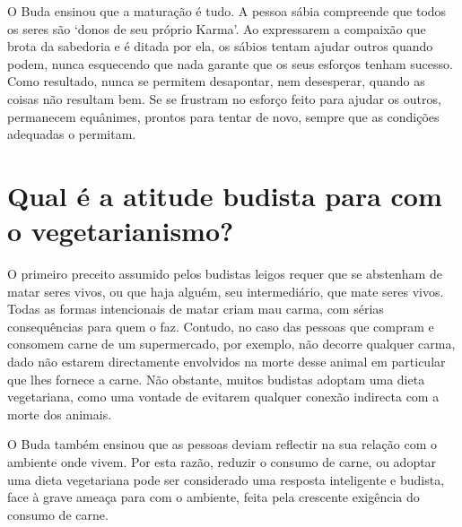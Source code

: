 O Buda ensinou que a maturação é tudo. A pessoa sábia compreende que
todos os seres são `donos de seu próprio Karma'. Ao expressarem a
compaixão que brota da sabedoria e é ditada por ela, os sábios tentam
ajudar outros quando podem, nunca esquecendo que nada garante que os
seus esforços tenham sucesso. Como resultado, nunca se permitem
desapontar, nem desesperar, quando as coisas não resultam bem. Se se
frustram no esforço feito para ajudar os outros, permanecem equânimes,
prontos para tentar de novo, sempre que as condições adequadas o
permitam.

\section{Qual é a atitude budista para com o vegetarianismo?}

O primeiro preceito assumido pelos budistas leigos requer que se
abstenham de matar seres vivos, ou que haja alguém, seu intermediário,
que mate seres vivos. Todas as formas intencionais de matar criam mau
carma, com sérias consequências para quem o faz. Contudo, no caso das
pessoas que compram e consomem carne de um supermercado, por exemplo,
não decorre qualquer carma, dado não estarem directamente envolvidos na
morte desse animal em particular que lhes fornece a carne. Não obstante,
muitos budistas adoptam uma dieta vegetariana, como uma vontade de
evitarem qualquer conexão indirecta com a morte dos animais.

O Buda também ensinou que as pessoas deviam reflectir na sua relação com
o ambiente onde vivem. Por esta razão, reduzir o consumo de carne, ou
adoptar uma dieta vegetariana pode ser considerado uma resposta
inteligente e budista, face à grave ameaça para com o ambiente, feita
pela crescente exigência do consumo de carne.
